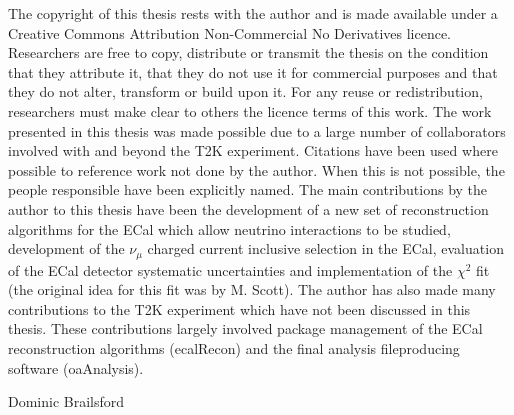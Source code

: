 \begin{declaration}
\noindent The copyright of this thesis rests with the author and is made available under a Creative Commons Attribution Non-Commercial No Derivatives licence. Researchers are free to copy, distribute or transmit the thesis on the condition that they attribute it, that they do not use it for commercial purposes and that they do not alter, transform or build upon it. For any reuse or redistribution, researchers must make clear to others the licence terms of this work.
\newline
\newline
The work presented in this thesis was made possible due to a large number of collaborators involved with and beyond the T2K experiment.  Citations have been used where possible to reference work not done by the author.  When this is not possible, the people responsible have been explicitly named.
\newline
\newline
The main contributions by the author to this thesis have been the development of a new set of reconstruction algorithms for the ECal which allow neutrino interactions to be studied, development of the $\nu_\mu$ charged current inclusive selection in the ECal, evaluation of the ECal detector systematic uncertainties and implementation of the $\chi^2$ fit (the original idea for this fit was by M. Scott).
\newline
\newline
The author has also made many contributions to the T2K experiment which have not been discussed in this thesis.  These contributions largely involved package management of the ECal reconstruction algorithms (ecalRecon) and the final analysis fileproducing software (oaAnalysis).
  \vspace*{1cm}
  \begin{flushright}
    Dominic Brailsford
  \end{flushright}
\end{declaration}


